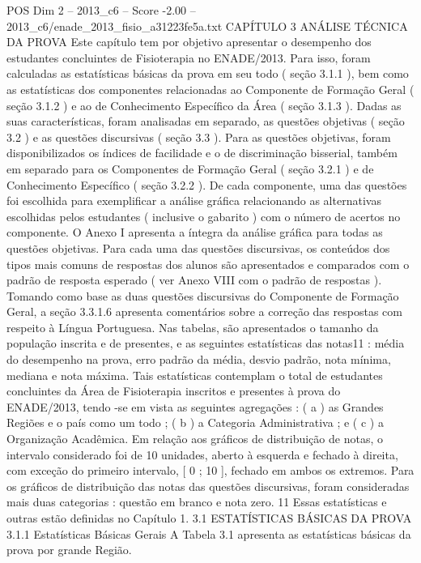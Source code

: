 \begin{textsample}{POS Dim 2 – 2013\_c6 – Score -2.00 – 2013\_c6/enade\_2013\_fisio\_a31223fe5a.txt}  \label{ex:f2_pos_378}
CAPÍTULO 3 ANÁLISE TÉCNICA DA PROVA Este capítulo tem por objetivo apresentar o desempenho dos estudantes concluintes de Fisioterapia no ENADE/2013.
Para isso, foram calculadas as estatísticas básicas da prova em seu todo ( seção 3.1.1 ), bem como as estatísticas dos componentes relacionadas ao Componente de Formação Geral ( seção 3.1.2 ) e ao de Conhecimento Específico da Área ( seção 3.1.3 ).
Dadas as suas características, foram analisadas em separado, as questões objetivas ( seção 3.2 ) e as questões discursivas ( seção 3.3 ).
Para as questões objetivas, foram disponibilizados os índices de facilidade e o de discriminação bisserial, também em separado para os Componentes de Formação Geral ( seção 3.2.1 ) e de Conhecimento Específico ( seção 3.2.2 ).
De cada componente, uma das questões foi escolhida para exemplificar a análise gráfica relacionando as alternativas escolhidas pelos estudantes ( inclusive o gabarito ) com o número de acertos no componente.
O Anexo I apresenta a íntegra da análise gráfica para todas as questões objetivas.
Para cada uma das questões discursivas, os conteúdos dos tipos mais comuns de respostas dos alunos são apresentados e comparados com o padrão de resposta esperado ( ver Anexo VIII com o padrão de respostas ).
Tomando como base as duas questões discursivas do Componente de Formação Geral, a seção 3.3.1.6 apresenta comentários sobre a correção das respostas com respeito à Língua Portuguesa.
Nas tabelas, são apresentados o tamanho da população inscrita e de presentes, e as seguintes estatísticas das notas11 : média do desempenho na prova, erro padrão da média, desvio padrão, nota mínima, mediana e nota máxima.
Tais estatísticas contemplam o total de estudantes concluintes da Área de Fisioterapia inscritos e presentes à prova do ENADE/2013, tendo -se em vista as seguintes agregações : ( a ) as Grandes Regiões e o país como um todo ; ( b ) a Categoria Administrativa ; e ( c ) a Organização Acadêmica.
Em relação aos gráficos de distribuição de notas, o intervalo considerado foi de 10 unidades, aberto à esquerda e fechado à direita, com exceção do primeiro intervalo, [ 0 ; 10 ], fechado em ambos os extremos.
Para os gráficos de distribuição das notas das questões discursivas, foram consideradas mais duas categorias : questão em branco e nota zero. 11 Essas estatísticas e outras estão definidas no Capítulo 1. 3.1 ESTATÍSTICAS BÁSICAS DA PROVA 3.1.1 Estatísticas Básicas Gerais A Tabela 3.1 apresenta as estatísticas básicas da prova por grande Região.

\end{textsample}
